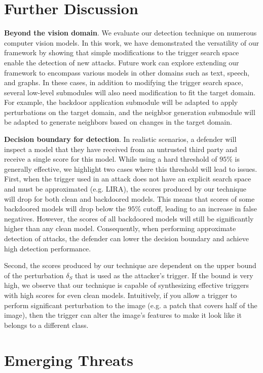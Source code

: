 \documentclass[letterpaper,twocolumn,10pt]{article}
\begin{document}
\begin{appendices}
\section{Further Discussion}
\label{appendix:D}
\textbf{Beyond the vision domain}. We evaluate our detection technique on numerous computer vision models. In this work, we have demonstrated the versatility of our framework by showing that simple modifications to the trigger search space enable the detection of new attacks. Future work can explore extending our framework to encompass various models in other domains such as text, speech, and graphs. In these cases, in addition to modifying the trigger search space, several low-level submodules will also need modification to fit the target domain. For example, the backdoor application submodule will be adapted to apply perturbations on the target domain, and the neighbor generation submodule will be adapted to generate neighbors based on changes in the target domain.

\textbf{Decision boundary for detection}. In realistic scenarios, a defender will inspect a model that they have received from an untrusted third party and receive a single score for this model. While using a hard threshold of $95\%$ is generally effective, we highlight two cases where this threshold will lead to issues. First, when the trigger used in an attack does not have an explicit search space and must be approximated (e.g. LIRA), the scores produced by our technique will drop for both clean and backdoored models. This means that scores of some backdoored models will drop below the $95\%$ cutoff, leading to an increase in false negatives. However, the scores of all backdoored models will still be significantly higher than any clean model. Consequently, when performing approximate detection of attacks, the defender can lower the decision boundary and achieve high detection performance. 

Second, the scores produced by our technique are dependent on the upper bound of the perturbation $\delta_{S}$ that is used as the attacker's trigger. If the bound is very high, we observe that our technique is capable of synthesizing effective triggers with high scores for even clean models. Intuitively, if you allow a trigger to perform significant perturbation to the image (e.g. a patch that covers half of the image), then the trigger can alter the image's features to make it look like it belongs to a different class.

\section{Emerging Threats}
\label{appendix:C}


\end{appendices}
\end{document}
